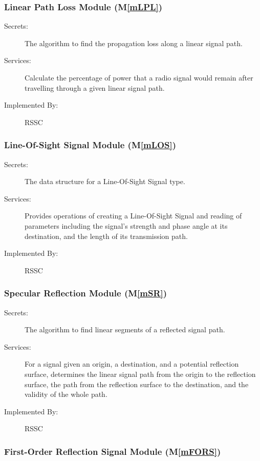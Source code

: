 \documentclass[12pt, titlepage]{article}
\newcommand{\mref}[1]{M\ref{#1}}
\begin{document}
\subsubsection{Linear Path Loss Module (\mref{mLPL})}

\begin{description}
\item[Secrets:]The algorithm to find the propagation loss along a linear signal path.
\item[Services:]Calculate the percentage of power that a radio signal would remain after travelling through a given linear signal path.
\item[Implemented By:] RSSC
\end{description}

\subsubsection{Line-Of-Sight Signal Module (\mref{mLOS})}

\begin{description}
\item[Secrets:]The data structure for a Line-Of-Sight Signal type.
\item[Services:]Provides operations of creating a Line-Of-Sight Signal and reading of parameters including the signal's strength and phase angle at its destination, and the length of its transmission path. 
\item[Implemented By:] RSSC
\end{description}

\subsubsection{Specular Reflection Module (\mref{mSR})}

\begin{description}
\item[Secrets:]The algorithm to find linear segments of a reflected signal path.
\item[Services:]For a signal given an origin, a destination, and a potential reflection surface, determines the linear signal path from the origin to the reflection surface, the path from the reflection surface to the destination, and the validity of the whole path.
\item[Implemented By:] RSSC
\end{description}

\subsubsection{First-Order Reflection Signal Module (\mref{mFORS})}
\end{document}
